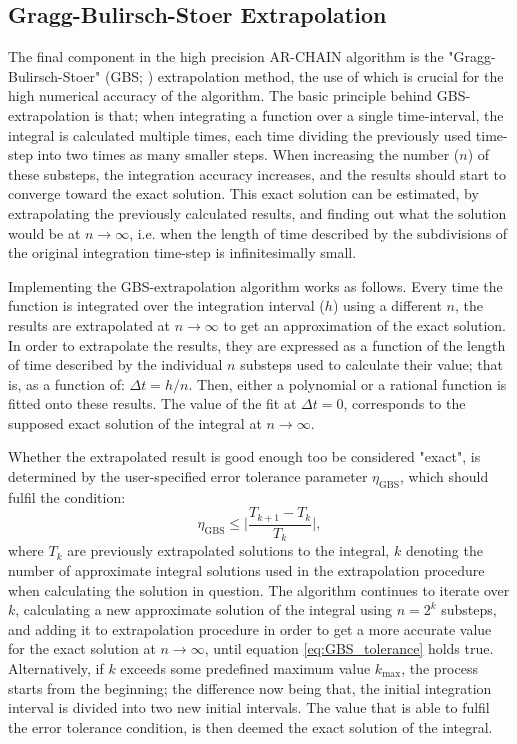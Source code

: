 \documentclass[english, twoside]{HYgradu}
\begin{document}
\subsection{Gragg-Bulirsch-Stoer Extrapolation} \label{section:extrapolation}

The final component in the high precision AR-CHAIN algorithm is the "Gragg-Bulirsch-Stoer" (GBS; \citealt{Gragg1965, Bulirsch1966}) extrapolation method, the use of which is crucial for the high numerical accuracy of the algorithm. The basic principle behind GBS-extrapolation is that; when integrating a function over a single time-interval, the integral is calculated multiple times, each time dividing the previously used time-step into two times as many smaller steps. When increasing the number ($n$) of these substeps, the integration accuracy increases, and the results should start to converge toward the exact solution. This exact solution can be estimated, by extrapolating the previously calculated results, and finding out what the solution would be at $n \rightarrow \infty$, i.e. when the length of time described by the subdivisions of the original integration time-step is infinitesimally small.

Implementing the GBS-extrapolation algorithm works as follows. Every time the function is integrated over the integration interval ($h$) using a different $n$, the results are extrapolated at $n \rightarrow \infty$ to get an approximation of the exact solution. In order to extrapolate the results, they are expressed as a function of the length of time described by the individual $n$ substeps used to calculate their value; that is, as a function of: $\Delta t = h/n$. Then, either a polynomial or a rational function is fitted onto these results. The value of the fit at $\Delta t = 0$, corresponds to the supposed exact solution of the integral at $n \rightarrow \infty$.

Whether the extrapolated result is good enough too be considered "exact", is determined by the user-specified error tolerance parameter $\eta_\mathrm{GBS}$, which should fulfil the condition:
\begin{equation}
\eta_\mathrm{GBS} \leq \bigg| \frac{T_{k+1} - T_k}{T_k} \bigg|, \label{eq:GBS_tolerance}
\end{equation}
where $T_k$ are previously extrapolated solutions to the integral, $k$ denoting the number of approximate integral solutions used in the extrapolation procedure when calculating the solution in question. The algorithm continues to iterate over $k$, calculating a new approximate solution of the integral using $n = 2^k$ substeps, and adding it to extrapolation procedure in order to get a more accurate value for the exact solution at $n \rightarrow \infty$, until equation \ref{eq:GBS_tolerance} holds true. Alternatively, if $k$ exceeds some predefined maximum value $k_\mathrm{max}$, the process starts from the beginning; the difference now being that, the initial integration interval is divided into two new initial intervals. The value that is able to fulfil the error tolerance condition, is then deemed the exact solution of the integral.
\end{document}
